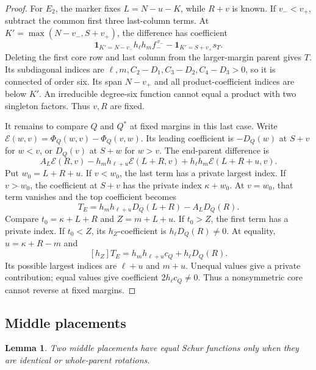 \documentclass[11pt,a4paper]{amsart}
\numberwithin{equation}{section}
\theoremstyle{plain}
\newtheorem{lemma}[theorem]{Lemma}
\theoremstyle{definition}
\begin{document}
\begin{proof}
For \(E_2\), the marker fixes \(L=N-u-K\), while \(R+v\) is known.  If \(v_-<v_+\), subtract the common first three last-column terms.  At \(K'=\max(N-v_-,S+v_+)\), the difference has coefficient
\begin{equation}\label{eq:end-moving-bottom}
 \mathbf1_{K'=N-v_-}h_\ell h_m f_-^{\,v_-}
 -\mathbf1_{K'=S+v_+}s_T.
\end{equation}
Deleting the first core row and last column from the larger-margin parent gives \(T\).  Its subdiagonal indices are
\(\ell,m,C_2-D_1,C_3-D_2,C_4-D_3>0\), so it is connected of order six.  Its span \(N-v_+\) and all product-coefficient indices are below \(K'\).  An irreducible degree-six function cannot equal a product with two singleton factors.  Thus \(v,R\) are fixed.

It remains to compare \(Q\) and \(Q^*\) at fixed margins in this last case.  Write \(\mathcal E(w,v)=\Phi_Q(w,v)-\Phi_Q(v,w)\).  Its leading coefficient is \(- D_Q(w)\) at \(S+v\) for \(w<v\), or \( D_Q(v)\) at \(S+w\) for \(w>v\).  The end-parent difference is
\begin{equation}\label{eq:end-orientation}
 A_L\mathcal E(R,v)-h_mh_{\ell+u}\mathcal E(L+R,v)
                       +h_\ell h_m\mathcal E(L+R+u,v).
\end{equation}
Put \(w_0=L+R+u\).  If \(v<w_0\), the last term has a private largest index.  If \(v>w_0\), the coefficient at \(S+v\) has the private index \(\kappa+w_0\).  At \(v=w_0\), that term vanishes and the top coefficient becomes
\[
 T_E=h_mh_{\ell+u} D_Q(L+R)-A_L D_Q(R).
\]
Compare \(t_0=\kappa+L+R\) and \(Z=m+L+u\).  If \(t_0>Z\), the first term has a private index.  If \(t_0<Z\), its \(h_Z\)-coefficient is \(h_\ell D_Q(R)\ne0\).  At equality, \(u=\kappa+R-m\) and
\[
 [h_Z]T_E=h_mh_{\ell+u}c_Q+h_\ell D_Q(R).
\]
Its possible largest indices are \(\ell+u\) and \(m+u\).  Unequal values give a private contribution; equal values give coefficient \(2h_\ell c_Q\ne0\).  Thus a nonsymmetric core cannot reverse at fixed margins.
\end{proof}

\subsection{Middle placements}

\begin{lemma}\label{lem:middle-placement-rigidity}
Two middle placements have equal Schur functions only when they are identical or whole-parent rotations.
\end{lemma}
\end{document}

